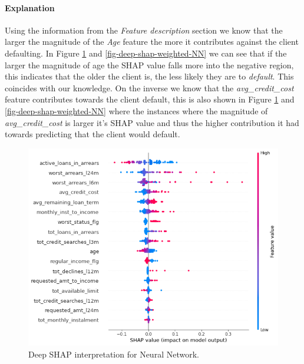 \paragraph{Explanation}
Using the information from the \emph{Feature description} section we know that the larger the magnitude of the \emph{Age} feature the more it contributes against the client defaulting. In Figure \ref{fig-deep-shap-NN} and \ref{fig-deep-shap-weighted-NN} we can see that if the larger the magnitude of age the SHAP value falls more into the negative region, this indicates that the older the client is, the less likely they are to \emph{default}. This coincides with our knowledge. On the inverse we know that the \emph{avg\_credit\_cost} feature contributes towards the client default, this is also shown in Figure \ref{fig-deep-shap-NN} and \ref{fig-deep-shap-weighted-NN} where the instances where the magnitude of \emph{avg\_credit\_cost} is larger it's SHAP value and thus the higher contribution it had towards predicting that the client would default.

\begin  {figure}[!htpb]
\centering
  \includegraphics[width=0.8\linewidth]{Credit_Images/NN_shap_deep_summary.png}
   \caption{Deep SHAP interpretation for Neural Network.}
    \label{fig-deep-shap-NN}
\end{figure}

